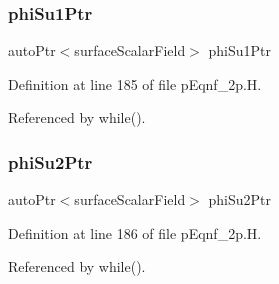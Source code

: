 \subsubsection{\texorpdfstring{phi\+Su1\+Ptr}{phiSu1Ptr}}
{\footnotesize\ttfamily auto\+Ptr$<$surface\+Scalar\+Field$>$ phi\+Su1\+Ptr}



Definition at line 185 of file p\+Eqnf\+\_\+2p.\+H.



Referenced by while().

\mbox{\label{pEqnf__2p_8H_af80a3d86e3c14c6ac34eee295647f041}} 
\subsubsection{\texorpdfstring{phi\+Su2\+Ptr}{phiSu2Ptr}}
{\footnotesize\ttfamily auto\+Ptr$<$surface\+Scalar\+Field$>$ phi\+Su2\+Ptr}



Definition at line 186 of file p\+Eqnf\+\_\+2p.\+H.



Referenced by while().

